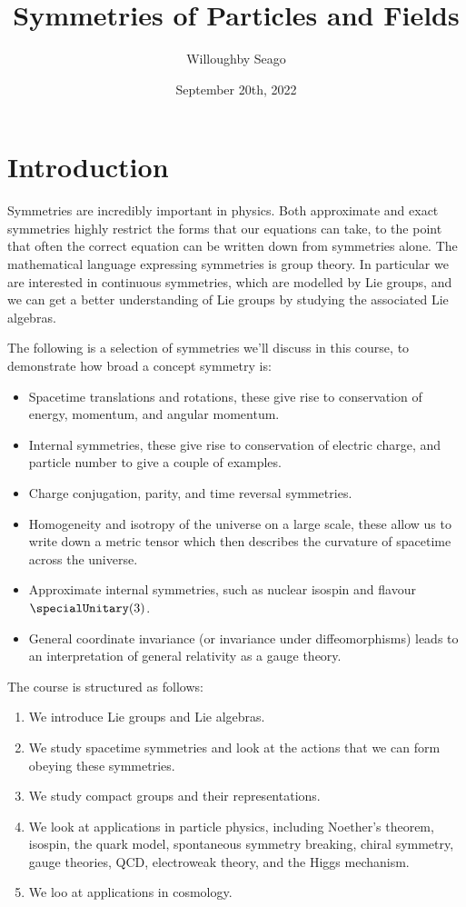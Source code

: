 \documentclass[fleqn]{NotesClass}
\title{Symmetries of Particles and Fields}
\author{Willoughby Seago}
\date{September 20th, 2022}
\begin{document}
    \frontmatter
    \titlepage
    \tableofcontents
    \mainmatter
    
    \chapter{Introduction}
    Symmetries are incredibly important in physics.
    Both approximate and exact symmetries highly restrict the forms that our equations can take, to the point that often the correct equation can be written down from symmetries alone.
    The mathematical language expressing symmetries is group theory.
    In particular we are interested in continuous symmetries, which are modelled by Lie groups, and we can get a better understanding of Lie groups by studying the associated Lie algebras.
    
    The following is a selection of symmetries we'll discuss in this course, to demonstrate how broad a concept symmetry is:
    \begin{itemize}
        \item Spacetime translations and rotations, these give rise to conservation of energy, momentum, and angular momentum.
        \item Internal symmetries, these give rise to conservation of electric charge, and particle number to give a couple of examples.
        \item Charge conjugation, parity, and time reversal symmetries.
        \item Homogeneity and isotropy of the universe on a large scale, these allow us to write down a metric tensor which then describes the curvature of spacetime across the universe.
        \item Approximate internal symmetries, such as nuclear isospin and flavour \(\specialUnitary(3)\).
        \item General coordinate invariance (or invariance under diffeomorphisms) leads to an interpretation of general relativity as a gauge theory.
    \end{itemize}
    
    The course is structured as follows:
    \begin{enumerate}
        \item We introduce Lie groups and Lie algebras.
        \item We study spacetime symmetries and look at the actions that we can form obeying these symmetries.
        \item We study compact groups and their representations.
        \item We look at applications in particle physics, including Noether's theorem, isospin, the quark model, spontaneous symmetry breaking, chiral symmetry, gauge theories, QCD, electroweak theory, and the Higgs mechanism.
        \item We loo at applications in cosmology.
    \end{enumerate}
    
\end{document}
